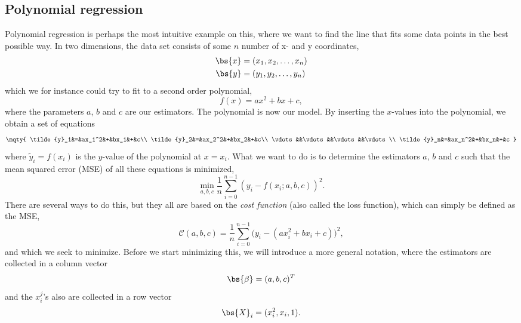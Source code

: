 \subsection{Polynomial regression}
Polynomial regression is perhaps the most intuitive example on this, where we want to find the line that fits some data points in the best possible way. In two dimensions, the data set consists of some $n$ number of x- and y coordinates,
\begin{align*}
\bs{x}&=(x_1,x_2,\hdots,x_n)\\
\bs{y}&=(y_1,y_2,\hdots,y_n)
\end{align*}
which we for instance could try to fit to a second order polynomial,
\begin{equation}
f(x)=ax^2+bx+c,
\end{equation}
where the parameters $a$, $b$ and $c$ are our estimators. The polynomial is now our model. By inserting the $x$-values into the polynomial, we obtain a set of equations
\begin{equation}
\mqty{
	\tilde{y}_1&=&ax_1^2&+&bx_1&+&c\\
	\tilde{y}_2&=&ax_2^2&+&bx_2&+&c\\
	\vdots&&\vdots&&\vdots&&\vdots\\
	\tilde{y}_n&=&ax_n^2&+&bx_n&+&c
}
\label{eq:lineareqs}
\end{equation}
where $\tilde{y}_i=f(x_i)$ is the $y$-value of the polynomial at $x=x_i$. What we want to do is to determine the estimators $a$, $b$ and $c$ such that the mean squared error (MSE) of all these equations is minimized,
\begin{equation}
\min_{a,b,c}\frac{1}{n}\sum_{i=0}^{n-1}(y_i-f(x_i;a,b,c))^2.
\end{equation}
There are several ways to do this, but they all are based on the \textit{cost function} (also called the loss function), which can simply be defined as the MSE,
\begin{equation}
\mathcal{C}(a,b,c)=\frac{1}{n}\sum_{i=0}^{n-1}\Big(y_i-(ax_i^2+bx_i+c)\Big)^2,
\end{equation}
and which we seek to minimize. Before we start minimizing this, we will introduce a more general notation, where the estimators are collected in a column vector 
\begin{equation*}
\bs{\beta}=(a,b,c)^T
\end{equation*}
and the $x_i^j$'s also are collected in a row vector
\begin{equation*}
\bs{X}_i=(x_i^2, x_i, 1).
\end{equation*}
